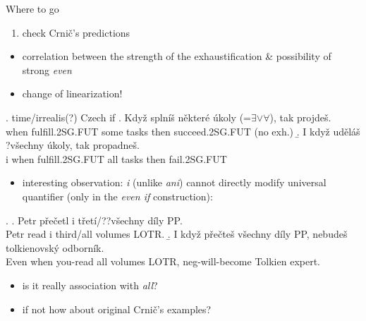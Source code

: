 \documentclass[ignorenonframetext,]{beamer}
\providecommand{\tightlist}{%
  \setlength{\itemsep}{0pt}\setlength{\parskip}{0pt}}
\begin{document}
\begin{frame}{Where to go}

\begin{enumerate}
\def\labelenumi{\arabic{enumi})}
\tightlist
\item
  check Crnič's predictions
\end{enumerate}

\begin{itemize}
\tightlist
\item
  correlation between the strength of the exhaustification \&
  possibility of strong \emph{even}
\item
  change of linearization!
\end{itemize}

\ex. time/irrealis(?) Czech if \a. Když splníš některé úkoly
(=\(\exists \vee \forall\)), tak projdeš.\\
when fulfill.2SG.FUT some tasks then succeed.2SG.FUT (no exh.) \b. I
když uděláš ?všechny úkoly, tak propadneš.\\
i when fulfill.2SG.FUT all tasks then fail.2SG.FUT

\end{frame}

\begin{frame}

\begin{itemize}
\tightlist
\item
  interesting observation: \emph{i} (unlike \emph{ani}) cannot directly
  modify universal quantifier (only in the \emph{even if} construction):
\end{itemize}

\ex. \a. Petr přečetl i třetí/??všechny díly PP.\\
Petr read i third/all volumes LOTR. \b. I když přečteš všechny díly PP,
nebudeš tolkienovský odborník.\\
Even when you-read all volumes LOTR, neg-will-become Tolkien expert.

\begin{itemize}
\tightlist
\item
  is it really association with \emph{all}?
\item
  if not how about original Crnič's examples?
\end{itemize}

\end{frame}
\end{document}
